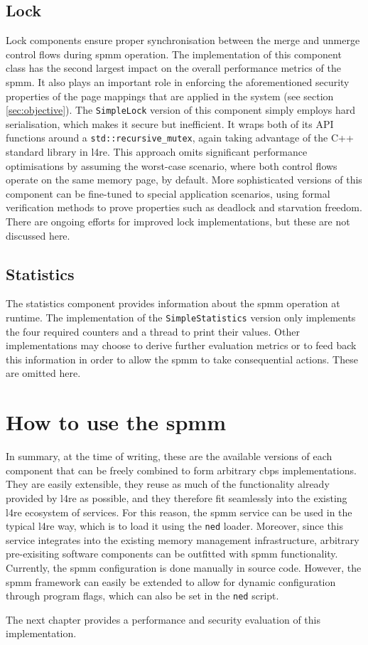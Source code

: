 \subsection*{Lock}
\label{subsec:lock}

Lock components ensure proper synchronisation between the merge and unmerge control flows during \ac{spmm} operation.
The implementation of this component class has the second largest impact on the overall performance metrics of the \ac{spmm}.
It also plays an important role in enforcing the aforementioned security properties of the page mappings that are applied in the system (see section \ref{sec:objective}).
The \texttt{SimpleLock} version of this component simply employs hard serialisation, which makes it secure but inefficient.
It wraps both of its API functions around a \texttt{std::recursive\_mutex}, again taking advantage of the C++ standard library in \ac{l4re}.
This approach omits significant performance optimisations by assuming the worst-case scenario, where both control flows operate on the same memory page, by default.
More sophisticated versions of this component can be fine-tuned to special application scenarios, using formal verification methods to prove properties such as deadlock and starvation freedom.
There are ongoing efforts for improved lock implementations, but these are not discussed here.

\subsection*{Statistics}
\label{subsec:statistics}

The statistics component provides information about the \ac{spmm} operation at runtime.
The implementation of the \texttt{SimpleStatistics} version only implements the four required counters and a thread to print their values.
Other implementations may choose to derive further evaluation metrics or to feed back this information in order to allow the \ac{spmm} to take consequential actions.
These are omitted here.

\section{How to use the \acs{spmm}}
\label{sec:how-to-use-the-spmm}

In summary, at the time of writing, these are the available versions of each component that can be freely combined to form arbitrary \ac{cbps} implementations.
They are easily extensible, they reuse as much of the functionality already provided by \ac{l4re} as possible, and they therefore fit seamlessly into the existing \ac{l4re} ecosystem of services.
For this reason, the \ac{spmm} service can be used in the typical \ac{l4re} way, which is to load it using the \texttt{ned} loader.
Moreover, since this service integrates into the existing memory management infrastructure, arbitrary pre-exisiting software components can be outfitted with \ac{spmm} functionality.
Currently, the \ac{spmm} configuration is done manually in source code.
However, the \ac{spmm} framework can easily be extended to allow for dynamic configuration through program flags, which can also be set in the \texttt{ned} script.

The next chapter provides a performance and security evaluation of this implementation.
